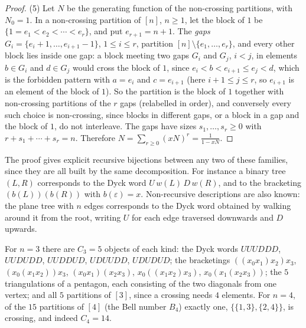 \begin{proof}
(5) Let $N$ be the generating function of the non-crossing partitions, with $N_0 = 1$. In a non-crossing partition of $[n]$, $n \geq 1$, let the block of $1$ be $\{1 = e_1 < e_2 < \cdots < e_r\}$, and
put $e_{r+1} = n + 1$. The \emph{gaps} $G_i = \{e_i + 1, \ldots, e_{i+1} - 1\}$, $1 \leq i \leq r$, partition $[n] \setminus \{e_1, \ldots, e_r\}$, and every other block lies inside one gap: a block
meeting two gaps $G_i$ and $G_j$, $i < j$, in elements $b \in G_i$ and $d \in G_j$ would cross the block of $1$, since $e_i < b < e_{i+1} \leq e_j < d$, which is the forbidden pattern with
$a = e_i$ and $c = e_{i+1}$ (here $i + 1 \leq j \leq r$, so $e_{i+1}$ is an element of the block of $1$). So the partition is the block of $1$ together with non-crossing partitions of the $r$ gaps (relabelled in order), and conversely every such choice is non-crossing,
since blocks in different gaps, or a block in a gap and the block of $1$, do not interleave. The gaps have sizes $s_1, \ldots, s_r \geq 0$ with $r + s_1 + \cdots + s_r = n$. Therefore
$N = \sum_{r \geq 0}(xN)^r = \frac{1}{1 - xN}$.
\end{proof}

\begin{remark}\label{generating-functions:remark-catalan-bijections}
The proof gives explicit recursive bijections between any two of these families, since they are all built by the same decomposition. For instance a binary tree $(L, R)$ corresponds to the Dyck
word $U\,w(L)\,D\,w(R)$, and to the bracketing $(b(L))(b(R))$ with $b(\varepsilon) = x$. Non-recursive descriptions are also known: the plane tree with $n$ edges corresponds to the Dyck word
obtained by walking around it from the root, writing $U$ for each edge traversed downwards and $D$ upwards.
\end{remark}

\begin{example}\label{generating-functions:example-catalan-small}
For $n = 3$ there are $C_3 = 5$ objects of each kind: the Dyck words $UUUDDD$, $UUDUDD$, $UUDDUD$, $UDUUDD$, $UDUDUD$; the bracketings $((x_0x_1)x_2)x_3$, $(x_0(x_1x_2))x_3$, $(x_0x_1)(x_2x_3)$,
$x_0((x_1x_2)x_3)$, $x_0(x_1(x_2x_3))$; the $5$ triangulations of a pentagon, each consisting of the two diagonals from one vertex; and all $5$ partitions of $[3]$, since a crossing needs $4$
elements. For $n = 4$, of the $15$ partitions of $[4]$ (the Bell number $B_4$) exactly one, $\{\{1, 3\}, \{2, 4\}\}$, is crossing, and indeed $C_4 = 14$.
\end{example}

